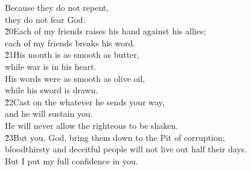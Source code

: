 \begin{poetry}
\poeml Because they do not repent, \\
\poemll    they do not fear God. \\
\poeml \v{20}Each of my friends raises his hand against his allies; \\
\poemll    each of my friends breaks his word. \\
\poeml \v{21}His mouth is as smooth as butter, \\
\poemll    while war is in his heart. \\
\poeml His words were as smooth as olive oil, \\
\poemll    while his sword is drawn. \\
\poeml \v{22}Cast on the  whatever he sends your way, \\
\poemll    and he will sustain you. \\
\poemlll       He will never allow the righteous to be shaken. \\
\poeml \v{23}But you, God, bring them down to the Pit of corruption; \\
\poemll    bloodthirsty and deceitful people will not live out half their days. \\
\poemlll       But I put my full confidence in you.
\end{poetry}

